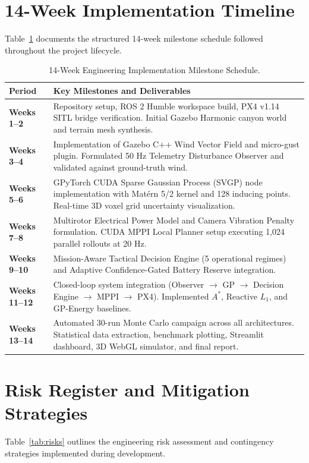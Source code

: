 \documentclass[12pt,a4paper,oneside]{report}
\begin{document}
\section{14-Week Implementation Timeline}
Table~\ref{tab:timeline} documents the structured 14-week milestone schedule followed throughout the project lifecycle.

\begin{table}[H]
    \centering
    \small
    \caption{14-Week Engineering Implementation Milestone Schedule.}
    \label{tab:timeline}
    \begin{tabularx}{\linewidth}{p{2.2cm}X}
        \toprule
        \textbf{Period} & \textbf{Key Milestones and Deliverables} \\
        \midrule
        \textbf{Weeks 1--2} & Repository setup, ROS 2 Humble workspace build, PX4 v1.14 SITL bridge verification. Initial Gazebo Harmonic canyon world and terrain mesh synthesis. \\
        \textbf{Weeks 3--4} & Implementation of Gazebo C++ Wind Vector Field and micro-gust plugin. Formulated 50 Hz Telemetry Disturbance Observer and validated against ground-truth wind. \\
        \textbf{Weeks 5--6} & GPyTorch CUDA Sparse Gaussian Process (SVGP) node implementation with Mat\'ern 5/2 kernel and 128 inducing points. Real-time 3D voxel grid uncertainty visualization. \\
        \textbf{Weeks 7--8} & Multirotor Electrical Power Model and Camera Vibration Penalty formulation. CUDA MPPI Local Planner setup executing 1,024 parallel rollouts at 20 Hz. \\
        \textbf{Weeks 9--10} & Mission-Aware Tactical Decision Engine (5 operational regimes) and Adaptive Confidence-Gated Battery Reserve integration. \\
        \textbf{Weeks 11--12} & Closed-loop system integration (Observer $\rightarrow$ GP $\rightarrow$ Decision Engine $\rightarrow$ MPPI $\rightarrow$ PX4). Implemented $A^*$, Reactive $L_1$, and GP-Energy baselines. \\
        \textbf{Weeks 13--14} & Automated 30-run Monte Carlo campaign across all architectures. Statistical data extraction, benchmark plotting, Streamlit dashboard, 3D WebGL simulator, and final report. \\
        \bottomrule
    \end{tabularx}
\end{table}

\section{Risk Register and Mitigation Strategies}
Table~\ref{tab:risks} outlines the engineering risk assessment and contingency strategies implemented during development.
\end{document}
